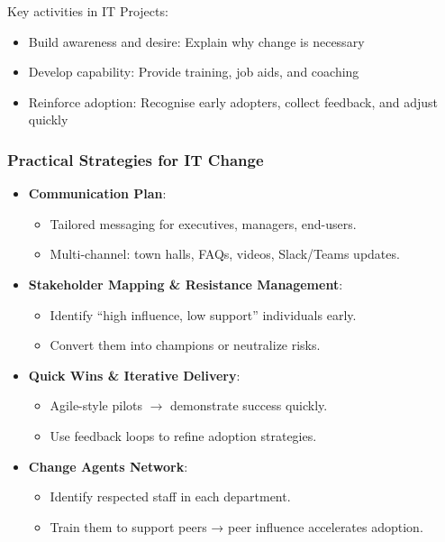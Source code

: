 \bigskip

\noindent  Key activities in IT Projects:

\begin{itemize}
    \item Build awareness and desire: Explain why change is necessary
    \item Develop capability: Provide training, job aids, and coaching
    \item Reinforce adoption: Recognise early adopters, collect feedback, and adjust quickly
\end{itemize}

\subsubsection{Practical Strategies for IT Change}

\begin{itemize}
    \item \textbf{Communication Plan}:
    \begin{itemize}
        \item Tailored messaging for executives, managers, end-users.
        \item Multi-channel: town halls, FAQs, videos, Slack/Teams updates.
    \end{itemize}
    \item \textbf{Stakeholder Mapping \& Resistance Management}:
    \begin{itemize}
        \item Identify “high influence, low support” individuals early.
        \item Convert them into champions or neutralize risks.
    \end{itemize}
    \item \textbf{Quick Wins \& Iterative Delivery}:
    \begin{itemize}
        \item Agile-style pilots $\xrightarrow{}$ demonstrate success quickly.
        \item Use feedback loops to refine adoption strategies.
    \end{itemize}
    \item \textbf{Change Agents Network}:
    \begin{itemize}
        \item Identify respected staff in each department.
        \item Train them to support peers → peer influence accelerates adoption.
    \end{itemize}
\end{itemize}

